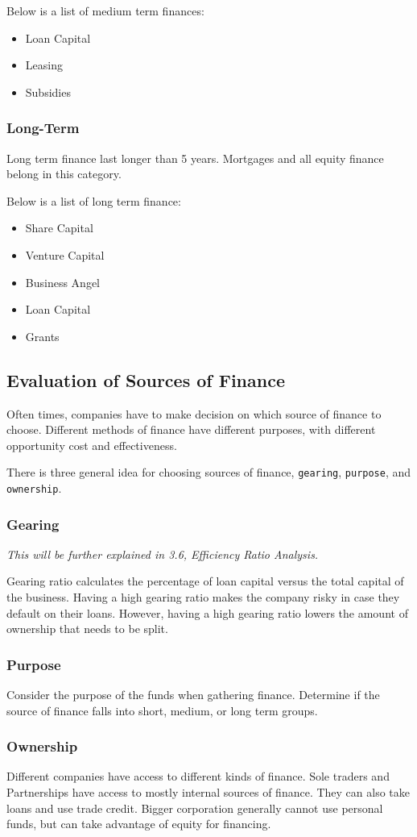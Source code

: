 \documentclass{standalone}
\begin{document}
Below is a list of medium term finances:
\begin{itemize}
    \item Loan Capital
    \item Leasing
    \item Subsidies
\end{itemize}

\subsubsection{Long-Term}
Long term finance last longer than 5 years.
Mortgages and all equity finance belong in this category.

Below is a list of long term finance:
\begin{itemize}
    \item Share Capital
    \item Venture Capital
    \item Business Angel
    \item Loan Capital
    \item Grants
\end{itemize}

\subsection{Evaluation of Sources of Finance}
Often times, companies have to make decision on which source of finance to choose.
Different methods of finance have different purposes, with different opportunity cost and effectiveness.

There is three general idea for choosing sources of finance, \texttt{gearing}, \texttt{purpose}, and \texttt{ownership}.

\subsubsection{Gearing}
\textit{This will be further explained in 3.6, Efficiency Ratio Analysis.}

Gearing ratio calculates the percentage of loan capital versus the total capital of the business.
Having a high gearing ratio makes the company risky in case they default on their loans.
However, having a high gearing ratio lowers the amount of ownership that needs to be split.

\subsubsection{Purpose}
Consider the purpose of the funds when gathering finance.
Determine if the source of finance falls into short, medium, or long term groups.

\subsubsection{Ownership}
Different companies have access to different kinds of finance.
Sole traders and Partnerships have access to mostly internal sources of finance.
They can also take loans and use trade credit.
Bigger corporation generally cannot use personal funds, but can take advantage of equity for financing.
\end{document}
